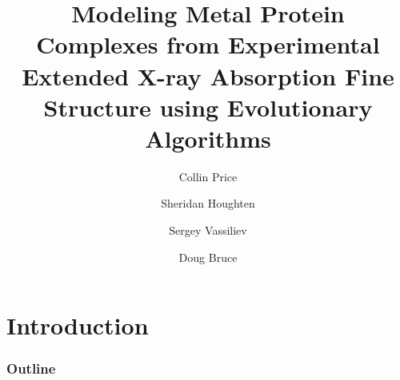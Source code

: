 \documentclass[10pt]{beamer}
\begin{document}
\title[Modeling OEC using EXAFS]{Modeling Metal Protein Complexes from Experimental Extended X-ray Absorption Fine Structure using Evolutionary Algorithms}

\author[Price \and Houghten \and Vassiliev \and Bruce]{
	Collin Price
	\and
	Sheridan Houghten
	\and
	Sergey Vassiliev
	\and
	Doug Bruce
}

\begin{frame}
	\titlepage
\end{frame}

\section{Introduction}

\begin{frame}
	\frametitle{Outline}
	\tableofcontents
\end{frame}
\end{document}
